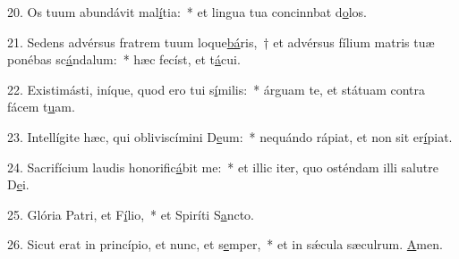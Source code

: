 20. Os tuum abundávit mal\uline{í}tia:~* et lingua tua concinnbat d\uline{o}los.\par 
21. Sedens advérsus fratrem tuum loque\uline{bá}ris,~† et advérsus fílium matris tuæ ponébas sc\uline{á}ndalum:~* hæc fecíst, et t\uline{á}cui.\par 
22. Existimásti, iníque, quod ero tui s\uline{í}milis:~* árguam te, et státuam contra fácem t\uline{u}am.\par 
23. Intellígite hæc, qui obliviscímini D\uline{e}um:~* nequándo rápiat, et non sit  er\uline{í}piat.\par 
24. Sacrifícium laudis honorific\uline{á}bit me:~* et illic iter, quo osténdam illi salutre D\uline{e}i.\par 
25. Glória Patri, et F\uline{í}lio,~* et Spiríti S\uline{a}ncto.\par 
26. Sicut erat in princípio, et nunc, et s\uline{e}mper,~* et in sǽcula sæculrum. \uline{A}men.\par 
